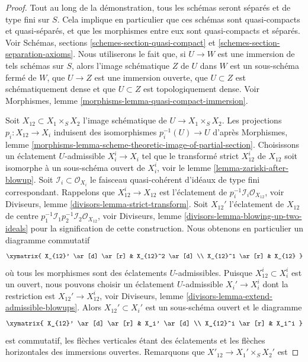 \begin{proof}
Tout au long de la démonstration, tous les schémas seront séparés et de type fini sur $S$.
Cela implique en particulier que ces schémas sont quasi-compacts et quasi-séparés,
et que les morphismes entre eux sont quasi-compacts et séparés.
Voir Schémas, sections \ref{schemes-section-quasi-compact} et
\ref{schemes-section-separation-axioms}.
Nous utiliserons le fait que, si $U \to W$ est une immersion de tels schémas sur $S$,
alors l'image schématique $Z$ de $U$ dans $W$ est un sous-schéma fermé
de $W$, que $U \to Z$ est une immersion ouverte, que $U \subset Z$ est
schématiquement dense et que $U \subset Z$ est topologiquement dense. Voir
Morphismes, lemme
\ref{morphisms-lemma-quasi-compact-immersion}.

\medskip\noindent
Soit $X_{12} \subset X_1 \times_S X_2$ l'image schématique
de $U \to X_1 \times_S X_2$. Les projections $p_i : X_{12} \to X_i$
induisent des isomorphismes $p_i^{-1}(U) \to U$ d'après
Morphismes, lemme
\ref{morphisms-lemma-scheme-theoretic-image-of-partial-section}.
Choisissons un éclatement $U$-admissible $X_i^i \to X_i$ tel que
le transformé strict $X_{12}^i$ de $X_{12}$ soit isomorphe à un
sous-schéma ouvert de $X_i^i$, voir
le lemme \ref{lemma-zariski-after-blowup}.
Soit $\mathcal{I}_i \subset \mathcal{O}_{X_i}$ le faisceau quasi-cohérent
d'idéaux de type fini correspondant.
Rappelons que $X_{12}^i \to X_{12}$ est l'éclatement de
$p_i^{-1}\mathcal{I}_i \mathcal{O}_{X_{12}}$, voir
Diviseurs, lemme \ref{divisors-lemma-strict-transform}.
Soit $X_{12}'$ l'éclatement de $X_{12}$ de centre
$p_1^{-1}\mathcal{I}_1 p_2^{-1}\mathcal{I}_2 \mathcal{O}_{X_{12}}$, voir
Diviseurs, lemme \ref{divisors-lemma-blowing-up-two-ideals}
pour la signification de cette construction. Nous obtenons en particulier un diagramme commutatif
$$
\xymatrix{
X_{12}' \ar[d] \ar[r] & X_{12}^2 \ar[d] \\
X_{12}^1 \ar[r] & X_{12}
}
$$
où tous les morphismes sont des éclatements $U$-admissibles.
Puisque $X_{12}^i \subset X_i^i$ est un ouvert, nous pouvons choisir un éclatement $U$-admissible
$X_i' \to X_i^i$ dont la restriction est $X_{12}' \to X_{12}^i$, voir
Diviseurs, lemme \ref{divisors-lemma-extend-admissible-blowups}.
Alors $X_{12}' \subset X_i'$ est un sous-schéma ouvert et le diagramme
$$
\xymatrix{
X_{12}' \ar[d] \ar[r] & X_i' \ar[d] \\
X_{12}^i \ar[r] & X_i^i
}
$$
est commutatif, les flèches verticales étant des éclatements et les flèches horizontales
des immersions ouvertes. Remarquons que $X'_{12} \to X_1' \times_S X_2'$ est

\end{proof}
